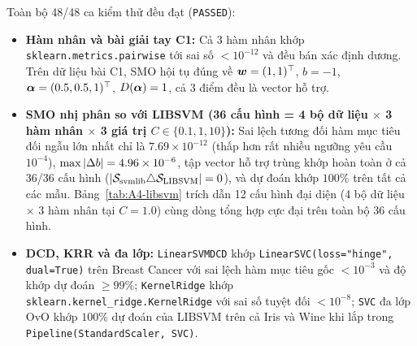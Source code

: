 Toàn bộ 48/48 ca kiểm thử đều đạt (\texttt{PASSED}):
\begin{itemize}
  \item \textbf{Hàm nhân và bài giải tay C1:} Cả 3 hàm nhân khớp \texttt{sklearn.\allowbreak metrics.\allowbreak pairwise} tới sai số $< 10^{-12}$ và đều bán xác định dương. Trên dữ liệu bài C1, SMO hội tụ đúng về $\bm{w} = (1, 1)^{\top}$, $b = -1$, $\bm{\alpha} = (0.5, 0.5, 1)^{\top}$, $D(\bm{\alpha}) = 1$, cả 3 điểm đều là vector hỗ trợ.
  \item \textbf{SMO nhị phân so với LIBSVM (36 cấu hình = 4 bộ dữ liệu $\times$ 3 hàm nhân $\times$ 3 giá trị $C \in \{0.1, 1, 10\}$):} Sai lệch tương đối hàm mục tiêu đối ngẫu lớn nhất chỉ là $7.69 \times 10^{-12}$ (thấp hơn rất nhiều ngưỡng yêu cầu $10^{-4}$), $\max\left\lvert \Delta b \right\rvert = 4.96 \times 10^{-6}$, tập vector hỗ trợ trùng khớp hoàn toàn ở cả 36/36 cấu hình ($\left\lvert \mathcal{S}_{\text{svmlib}} \triangle \mathcal{S}_{\text{LIBSVM}} \right\rvert = 0$), và dự đoán khớp $100\%$ trên tất cả các mẫu. Bảng~\ref{tab:A4-libsvm} trích dẫn 12 cấu hình đại diện (4 bộ dữ liệu $\times$ 3 hàm nhân tại $C = 1.0$) cùng dòng tổng hợp cực đại trên toàn bộ 36 cấu hình.
  \item \textbf{DCD, KRR và đa lớp:} \texttt{LinearSVMDCD} khớp \texttt{LinearSVC(loss="hinge", dual=True)} trên Breast Cancer với sai lệch hàm mục tiêu gốc $< 10^{-3}$ và độ khớp dự đoán $\ge 99\%$; \texttt{KernelRidge} khớp \texttt{sklearn.\allowbreak kernel\_ridge.\allowbreak KernelRidge} với sai số tuyệt đối $< 10^{-8}$; \texttt{SVC} đa lớp OvO khớp $100\%$ dự đoán của LIBSVM trên cả Iris và Wine khi lắp trong \texttt{Pipeline(StandardScaler, SVC)}.
\end{itemize}

